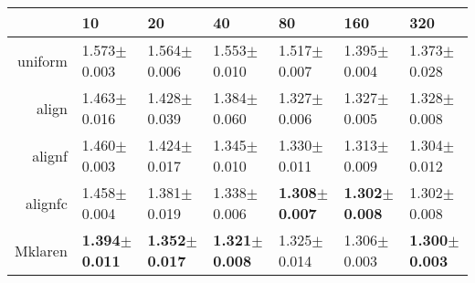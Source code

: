 \begin{table}[ht]
\centering
\begin{tabular}{rllllll}
  \hline
 & 10 & 20 & 40 & 80 & 160 & 320 \\ 
  \hline
uniform & 1.573$\pm$0.003 & 1.564$\pm$0.006 & 1.553$\pm$0.010 & 1.517$\pm$0.007 & 1.395$\pm$0.004 & 1.373$\pm$0.028 \\ 
  align & 1.463$\pm$0.016 & 1.428$\pm$0.039 & 1.384$\pm$0.060 & 1.327$\pm$0.006 & 1.327$\pm$0.005 & 1.328$\pm$0.008 \\ 
  alignf & 1.460$\pm$0.003 & 1.424$\pm$0.017 & 1.345$\pm$0.010 & 1.330$\pm$0.011 & 1.313$\pm$0.009 & 1.304$\pm$0.012 \\ 
  alignfc & 1.458$\pm$0.004 & 1.381$\pm$0.019 & 1.338$\pm$0.006 & \textbf{1.308$\pm$0.007} & \textbf{1.302$\pm$0.008} & 1.302$\pm$0.008 \\ 
  Mklaren & \textbf{1.394$\pm$0.011} & \textbf{1.352$\pm$0.017} & \textbf{1.321$\pm$0.008} & 1.325$\pm$0.014 & 1.306$\pm$0.003 & \textbf{1.300$\pm$0.003} \\ 
   \hline
\end{tabular}
\end{table}
